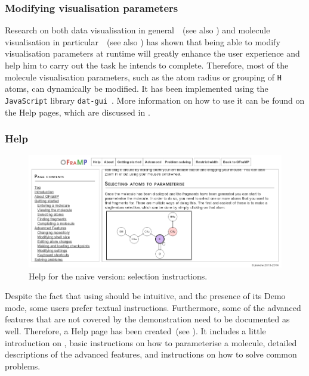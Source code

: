 \subsubsection{Modifying visualisation parameters}
Research on both data visualisation in general~\cite{gallopoulos1994computer}~(see also ) and molecule visualisation in particular~\cite{aksela2008computer,taylor2013interface}~(see also ) has shown that being able to modify visualisation parameters at runtime will greatly enhance the user experience and help him to carry out the task he intends to complete. Therefore, most of the molecule visualisation parameters, such as the atom radius or grouping of \verb|H| atoms, can dynamically be modified. It has been implemented using the \verb|JavaScript| library \verb|dat-gui|~\cite{data2011dat}. More information on how to use it can be found on the \oframp{} Help pages, which are discussed in .

\subsubsection{Help}

\begin{figure}
\center
\includegraphics[width=.9\textwidth]{img/help.png}
\caption{\oframp{} Help for the naive version: selection instructions.}
\end{figure}

Despite the fact that using \oframp{} should be intuitive, and the presence of its Demo mode, some users prefer textual instructions. Furthermore, some of the advanced features that are not covered by the demonstration need to be documented as well. Therefore, a Help page has been created~(see ). It includes a little introduction on \oframp, basic instructions on how to parameterise a molecule, detailed descriptions of the advanced features, and instructions on how to solve common problems.

